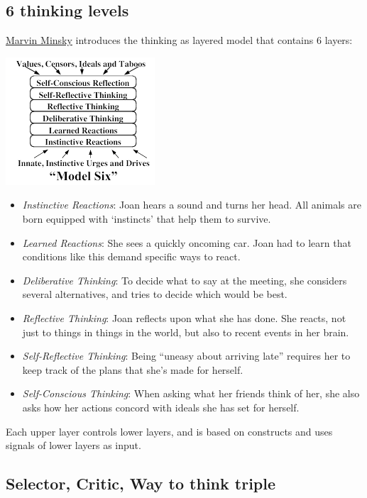 \documentclass{acm_proc_article-sp}
\begin{document}
\subsection{6 thinking levels}

\href{http://web.media.mit.edu/~minsky/E5/eb5.html}{Marvin Minsky} introduces the thinking as layered model that contains 6 layers:

\includegraphics{model_6.png}

\begin{itemize}
 \item \emph{Instinctive Reactions}:  Joan hears a sound and turns her head. All animals are born equipped with ‘instincts’ that help them to survive.
 \item \emph{Learned Reactions}: She sees a quickly oncoming car. Joan had to learn that conditions like this demand specific ways to react.
 \item \emph{Deliberative Thinking}: To decide what to say at the meeting, she considers several alternatives, and tries to decide which would be best.
 \item \emph{Reflective Thinking}: Joan reflects upon what she has done. She reacts, not just to things in things in the world, but also to recent events in her brain.
 \item \emph{Self-Reflective Thinking}: Being “uneasy about arriving late” requires her to keep track of the plans that she’s made for herself.
 \item \emph{Self-Conscious Thinking}: When asking what her friends think of her, she also asks how her actions concord with ideals she has set for herself.
\end{itemize}

Each upper layer controls lower layers, and is based on constructs and uses signals of lower layers as input.

\subsection{Selector, Critic, Way to think triple}
\end{document}
